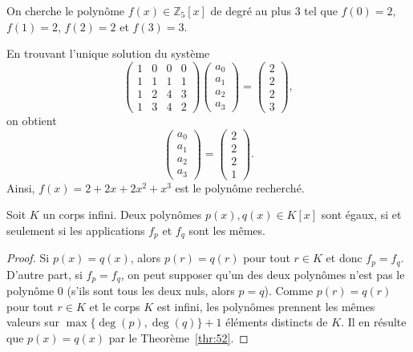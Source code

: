 \begin{example}
  \label{exe:38}
  On cherche le polynôme $f(x) ∈ ℤ_5[x]$ de degré au plus $3$ tel que
  $f(0) = 2$, $f(1)=2$, $f(2) = 2$ et $f(3) = 3$.

  En trouvant l'unique solution du système
  \begin{displaymath}
    \left(\begin{array}{rrrr}
1 & 0 & 0 & 0 \\
1 & 1 & 1 & 1 \\
1 & 2 & 4 & 3 \\
1 & 3 & 4 & 2
\end{array}\right)
\begin{pmatrix}
  a_0 \\ a_1 \\ a_2 \\ a_3
\end{pmatrix}
=
\begin{pmatrix}
  2 \\ 2 \\ 2 \\3
\end{pmatrix},
\end{displaymath}on obtient
\begin{displaymath}
  \begin{pmatrix}
  a_0 \\ a_1 \\ a_2 \\ a_3
\end{pmatrix} =
\begin{pmatrix}
  2 \\ 2 \\ 2 \\ 1
\end{pmatrix}.
\end{displaymath}
Ainsi, $f(x) = 2 + 2x + 2x^2 + x^3$ est le polynôme recherché. 

\end{example}


\begin{corollary}
  \label{thr:42}
  Soit $K$ un corps infini. Deux polynômes $p(x),q(x) ∈ K[x]$ sont égaux, si et seulement si les applications $f_p$ et $f_q$ sont les mêmes.
\end{corollary}
\begin{proof}
  Si $p(x) = q(x)$, alors $p(r) = q(r)$ pour tout $r ∈K$ et donc $f_p = f_q$. D'autre part, si $f_p = f_q$, on peut supposer qu'un des deux polynômes n'est pas le polynôme $0$ (s'ils sont tous les deux nuls, alors $p=q$).  Comme $p(r) = q(r)$ pour tout $r ∈K$ et le corps $K$ est infini, les polynômes prennent les mêmes valeurs sur $\max\{\deg(p),\deg(q)\}+1$ éléments distincts de $K$. Il en résulte que $p(x) = q(x)$ par le Theorème~\ref{thr:52}. 
\end{proof}




